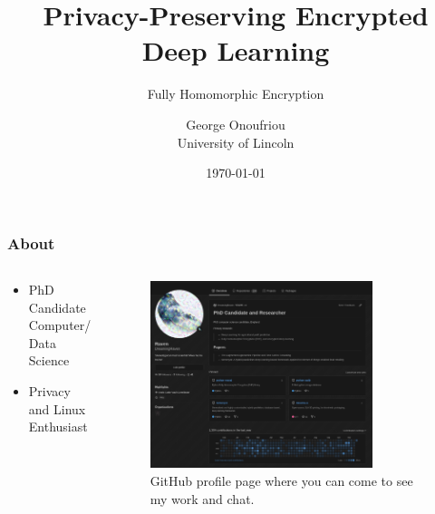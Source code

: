 \documentclass[aspectratio=169]{beamer}
\title{Privacy-Preserving Encrypted Deep Learning}
\subtitle{Fully Homomorphic Encryption}
\author{George Onoufriou\\University of Lincoln}
\date{\today}
\begin{document}

  \frame{\titlepage}

  \begin{frame}
    \frametitle{About}
    \begin{columns}
      \begin{column}{0.5\textwidth}
        \begin{itemize}
          \item PhD Candidate Computer/ Data Science
          \item Privacy and Linux Enthusiast
        \end{itemize}
      \end{column}
      \begin{column}{0.5\textwidth}
        \begin{figure}[th!]
          \centering
          \includegraphics[width=0.8\textwidth]{gh.png}
          \caption{GitHub profile page where you can come to see my work and chat. \autocite{repository}}
          \label{fig:gh}
        \end{figure}
      \end{column}
    \end{columns}
  \end{frame}
\end{document}
